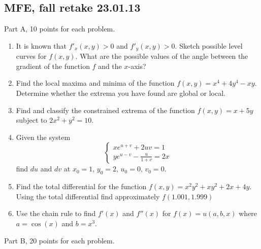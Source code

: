\subsection{MFE, fall retake 23.01.13}

Part A, 10 points for each problem.

\vspace{20pt}

\begin{enumerate}
\item It is known that $f'_x(x,y)>0$ and $f'_y(x,y)>0$. Sketch possible level curves for $f(x,y)$. What are the possible values of the angle between the gradient of the function $f$ and the $x$-axis?
\item Find the local maxima and minima of the function $f(x,y)=x^4+4y^4-xy$. Determine whether the extrema you have found are global or local.
\item Find and classify the constrained extrema of the function $f(x,y)=x+5y$ subject to $2x^2+y^2=10$.

\item Given the system
\[
\begin{cases}
xe^{u+v}+2uv=1 \\
ye^{u-v}-\frac{u}{1+v}=2x
\end{cases}
\]
find $du$ and $dv$ at $x_0 = 1$, $y_0 = 2$, $u_0 = 0$, $v_0 = 0$.

\item Find the total differential for the function $f(x,y)=x^2y^2+xy^2+2x+4y$. Using the total differential find approximately $f(1.001,1.999)$

\item Use the chain rule to find $f'(x)$ and $f''(x)$ for $f(x)=u(a,b,x)$ where $a=\cos(x)$ and $b=x^3$.

\end{enumerate}

\vspace{20pt}

Part B, 20 points for each problem.

\vspace{20pt}

